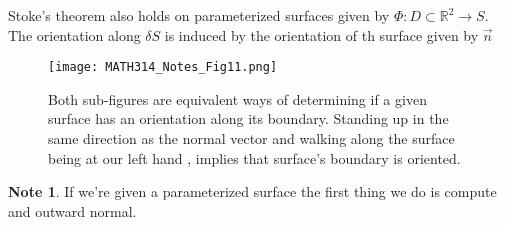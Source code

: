 \documentclass[
	12pt,
	]{article}
\newcommand{\R}{\mathbb{R}}
\theoremstyle{custom}
\theoremstyle{custom}
\theoremstyle{custom}
\theoremstyle{custom}
\theoremstyle{custom}
\theoremstyle{definition}
\theoremstyle{example}
\newtheorem*{note}{Note}
\theoremstyle{note}
\theoremstyle{remark}
\theoremstyle{example}
\newcounter{theo}[section]\setcounter{theo}{0}
\numberwithin{equation}{subsection}
\begin{document}
				\noindent Stoke's theorem also holds on parameterized surfaces given by $\Phi : D\subset \R^{2} \to S$. The orientation along $\delta S$ is induced by the orientation of th surface given by $\vec{n}$
				\begin{figure}[H]
					\centering
					\texttt{[image: MATH314\_Notes\_Fig11.png]}
					\captionsetup{margin=1.5cm , justification=raggedright} \caption{Both sub-figures are equivalent ways of determining if a given surface has an orientation along its boundary. Standing up in the same direction as the normal vector and walking along the surface being at our left hand , implies that surface's boundary is oriented.}
				\end{figure}
				
				\begin{note}
					If we're given a parameterized surface the first thing we do is compute and outward normal.
				\end{note}
				
\end{document}
